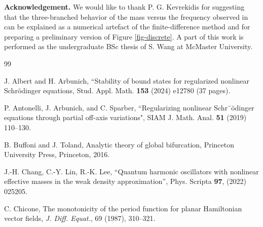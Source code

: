 \documentclass[12pt,reqno]{amsart}
\numberwithin{equation}{section}
\numberwithin{figure}{section}
\begin{document}
{\bf Acknowledgement.} We would like to thank P. G. Kevrekidis for suggesting that the three-branched behavior of the mass versus the frequency observed in \cite{KPR24} can be explained as a numerical artefact of the finite-difference method and for preparing a preliminary version of Figure \ref{fig-discrete}. A part of this work is performed as the undergraduate BSc thesis of S. Wang at McMaster University.


		 
	\begin{thebibliography}{99}
		


 J. Albert and H. Arbunich, ``Stability of bound states for regularized nonlinear Schr\"{o}dinger equations, Stud. Appl. Math. {\bf 153} (2024) e12780 (37 pages).

 P. Antonelli, J. Arbunich, and C. Sparber, ``Regularizing nonlinear Schr¨\"{o}dinger equations through partial off-axis variations", SIAM J. Math. Anal. {\bf 51} (2019) 110--130.	
		
		
							
		
		 B. Buffoni and J. Toland, Analytic theory of global bifurcation, Princeton University Press, Princeton, 2016.

 J.-H. Chang, C.-Y. Lin, R.-K. Lee,
``Quantum harmonic oscillators with nonlinear effective masses in the weak density approximation'', Phys. Scripta {\bf 97}, (2022) 025205.
		
		 C. Chicone,	The monotonicity of the period function for planar Hamiltonian vector fields, \textit{J. Diff. Equat.}, 69 (1987), 310–321. 

		



\end{thebibliography}
\end{document}
